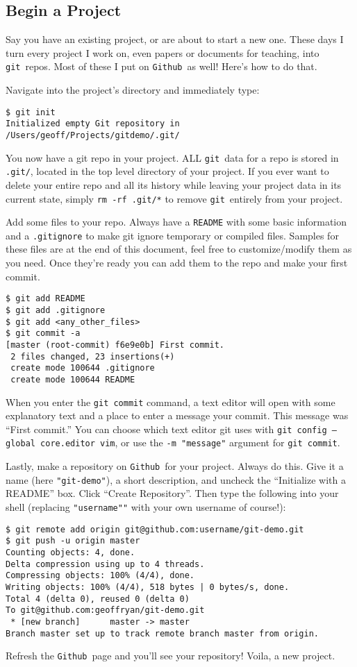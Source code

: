 \documentclass[14pt]{amsart}
\newcommand{\git}{{\texttt{git}}}
\newcommand{\github}{{\texttt{Github}}}
\begin{document}
\subsection{Begin a Project}

Say you have an existing project, or are about to start a new one.  These days I turn every project I work on, even papers or documents for teaching, into \git\ repos.  Most of these I put on \github\ as well!  Here's how to do that.

Navigate into the project's directory and immediately type:
\begin{lstlisting}
$ git init
Initialized empty Git repository in /Users/geoff/Projects/gitdemo/.git/
\end{lstlisting}
You now have a git repo in your project.  ALL \git\ data for a repo is stored in \texttt{.git/}, located in the top level directory of your project.  If you ever want to delete your entire repo and all its history while leaving your project data in its current state, simply \texttt{rm -rf .git/*} to remove \git\ entirely from your project.

Add some files to your repo. Always have a \texttt{README} with some basic information and a \texttt{.gitignore} to make git ignore temporary or compiled files.  Samples for these files are at the end of this document, feel free to customize/modify them as you need.  Once they're ready you can add them to the repo and make your first commit.

\begin{lstlisting}
$ git add README
$ git add .gitignore
$ git add <any_other_files>
$ git commit -a
[master (root-commit) f6e9e0b] First commit.
 2 files changed, 23 insertions(+)
 create mode 100644 .gitignore
 create mode 100644 README
\end{lstlisting}

When you enter the \texttt{git commit} command, a text editor will open with some explanatory text and a place to enter a message your commit.  This message was ``First commit.''  You can choose which text editor git uses with \texttt{git config --global core.editor vim}, or use the \texttt{-m "message"} argument for \texttt{git commit}.

Lastly, make a repository on \github\ for your project.  Always do this.  Give it a name (here \texttt{"git-demo"}), a short description, and uncheck the ``Initialize with a README'' box.  Click ``Create Repository''.  Then type the following into your shell (replacing \texttt{"username""} with your own username of course!):
\begin{lstlisting}
$ git remote add origin git@github.com:username/git-demo.git
$ git push -u origin master
Counting objects: 4, done.
Delta compression using up to 4 threads.
Compressing objects: 100% (4/4), done.
Writing objects: 100% (4/4), 518 bytes | 0 bytes/s, done.
Total 4 (delta 0), reused 0 (delta 0)
To git@github.com:geoffryan/git-demo.git
 * [new branch]      master -> master
Branch master set up to track remote branch master from origin.
\end{lstlisting}
Refresh the \github\ page and you'll see your repository!  Voila, a new project.  
\end{document}
